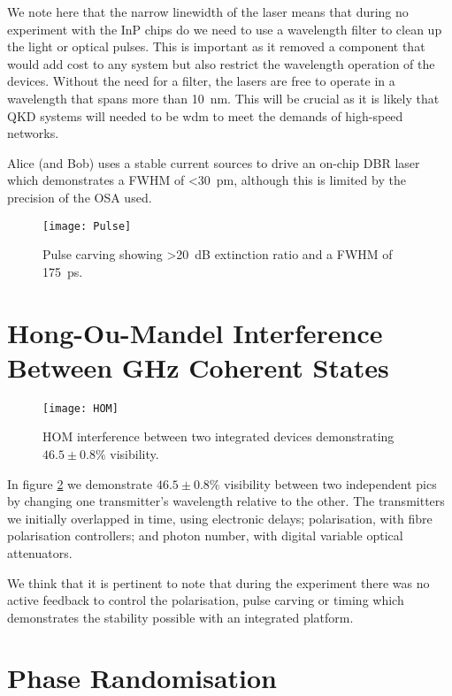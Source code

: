 {We note here that the narrow linewidth of the laser means that during no experiment with the \ac{InP} chips do we need to use a wavelength filter to clean up the light or optical pulses. This is important as it removed a component that would add cost to any system but also restrict the wavelength operation of the devices. Without the need for a filter, the lasers are free to operate in a wavelength that spans more than \SI{10}{nm}. This will be crucial as it is likely that \ac{QKD} systems will needed to be \ac{wdm} to meet the demands of high-speed networks.

Alice (and Bob) uses a stable current sources to drive an on-chip \ac{DBR} laser which demonstrates a \ac{FWHM} of \SI{<30}{pm}, although this is limited by the precision of the \ac{OSA} used.

\begin{figure}[tbp]
	\centering
	\texttt{[image: Pulse]}
	\caption[Pulse carving]{Pulse carving showing \SI{>20}{dB} extinction ratio and a \ac{FWHM} of \SI{175}{\pico\second}.}
	\label{fig:pulses}
\end{figure}

\section{Hong-Ou-Mandel Interference Between GHz Coherent States}

\begin{figure}[tbp]
	\centering
	\texttt{[image: HOM]}
	\caption[Hong-Ou-Mandel interference between integrated devices]{\ac{HOM} interference between two integrated devices demonstrating $46.5\pm0.8\%$ visibility.}
	\label{fig:HOM}
\end{figure}

In figure \ref{fig:HOM} we demonstrate $46.5 \pm 0.8  \%$ visibility between two independent \acp{pic} by changing one transmitter's wavelength relative to the other. The transmitters we initially overlapped in time, using electronic delays; polarisation, with fibre polarisation controllers; and photon number, with digital variable optical attenuators. 

We think that it is pertinent to note that during the experiment there was no active feedback to control the polarisation, pulse carving or timing which demonstrates the stability possible with an integrated platform. 

\section{Phase Randomisation}

}

